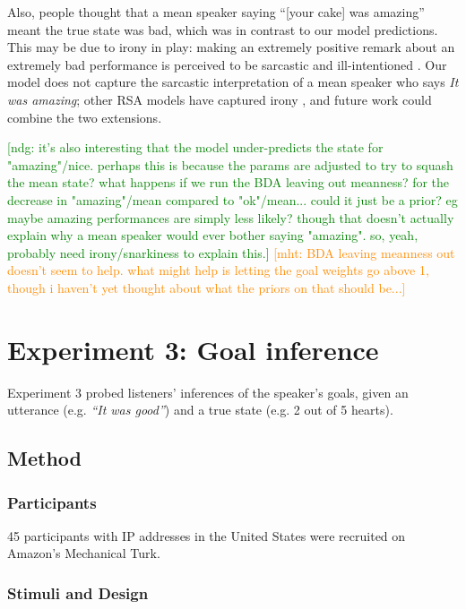\documentclass[10pt,letterpaper]{article}
\newcommand{\ndg}[1]{\textcolor{Green}{[ndg: #1]}}
\newcommand{\mht}[1]{\textcolor{DarkOrange}{[mht: #1]}}
\begin{document}
Also, people thought that a mean speaker saying ``[your cake] was amazing'' meant the true state was bad, which was in contrast to our model predictions. 
This may be due to irony in play: making an extremely positive remark about an extremely bad performance is perceived to be sarcastic and ill-intentioned \cite{colston1997}. 
Our model does not capture the sarcastic interpretation of a mean speaker who says \emph{It was amazing}; 
other RSA models have captured irony \cite{Kao2015}, and future work could combine the two extensions.

\ndg{it's also interesting that the model under-predicts the state for "amazing"/nice. perhaps this is because the params are adjusted to try to squash the mean state? what happens if we run the BDA leaving out meanness?
for the decrease in "amazing"/mean compared to "ok"/mean... could it just be a prior? eg maybe amazing performances are simply less likely? though that doesn't actually explain why a mean speaker would ever bother saying "amazing". so, yeah, probably need irony/snarkiness to explain this.}
\mht{BDA leaving meanness out doesn't seem to help. what might help is letting the goal weights go above 1, though i haven't yet thought about what the priors on that should be...}

\section{Experiment 3: Goal inference}


Experiment 3 probed listeners' inferences of the speaker's goals, given an utterance (e.g. \emph{``It was good''}) and a true state (e.g. 2 out of 5 hearts). 

\subsection{Method} 

\subsubsection{Participants}

45 participants with IP addresses in the United States were recruited on Amazon's Mechanical Turk. 

\subsubsection{Stimuli and Design}
\end{document}
